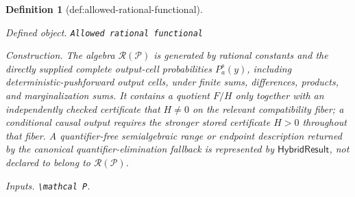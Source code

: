 \documentclass{article}
\newtheorem{definition}{Definition}
\begin{document}
\begin{definition}[def:allowed-rational-functional]\label{def:allowed-rational-functional}
\par\smallskip\noindent\emph{Defined object.} \texttt{Allowed rational functional}
\par\smallskip\noindent\emph{Construction.} The algebra \(\mathscr R(\mathcal P)\) is generated by rational constants and the directly supplied complete output-cell probabilities \(P_a^s(y)\), including deterministic-pushforward output cells, under finite sums, differences, products, and marginalization sums.  It contains a quotient \(F/H\) only together with an independently checked certificate that \(H\ne0\) on the relevant compatibility fiber; a conditional causal output requires the stronger stored certificate \(H>0\) throughout that fiber.  A quantifier-free semialgebraic range or endpoint description returned by the canonical quantifier-elimination fallback is represented by \(\mathsf{HybridResult}\), not declared to belong to \(\mathscr R(\mathcal P)\).
\par\smallskip\noindent\emph{Inputs.} \texttt{\textbackslash{}\allowbreak{}mathcal P}.
\end{definition}
\end{document}
